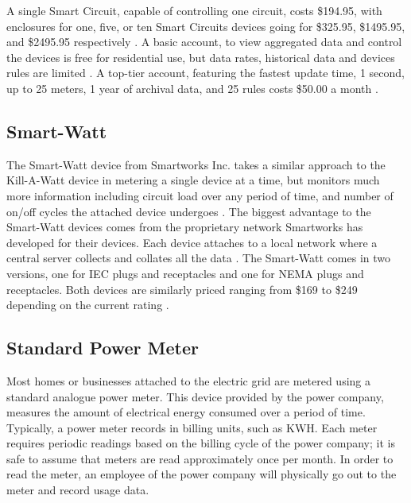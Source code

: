 A single Smart Circuit, capable of controlling one circuit, costs \$194.95, with enclosures for one, five, or ten Smart Circuits devices going for \$325.95, \$1495.95, and \$2495.95 respectively \cite{WattsUpDatasheet}. A basic account, to view aggregated data and control the devices is free for residential use, but data rates, historical data and devices rules are limited \cite{WattsUpServices}. A top-tier account, featuring the fastest update time, 1 second, up to 25 meters, 1 year of archival data, and 25 rules costs \$50.00 a month \cite{WattsUpServices}.

\subsection{Smart-Watt} %
The Smart-Watt device from Smartworks Inc. takes a similar approach to the Kill-A-Watt device in metering a single device at a time, but monitors much more information including circuit load over any period of time, and number of on/off cycles the attached device undergoes \cite{SmartWattBrochure}. The biggest advantage to the Smart-Watt devices comes from the proprietary network Smartworks has developed for their devices. Each device attaches to a local network where a central server collects and collates all the data \cite{SmartWattBrochure}. The Smart-Watt comes in two versions, one for \ac{IEC} plugs and receptacles and one for \ac{NEMA} plugs and receptacles. Both devices are similarly priced ranging from \$169 to \$249 depending on the current rating \cite{SmartWattBrochure}.

\subsection{Standard Power Meter} %
Most homes or businesses attached to the electric grid are metered using a standard analogue power meter. This device provided by the power company, measures the amount of electrical energy consumed over a period of time. Typically, a power meter records in billing units, such as KWH. Each meter requires periodic readings based on the billing cycle of the power company; it is safe to assume that meters are read approximately once per month. In order to read the meter, an employee of the power company will physically go out to the meter and record usage data.

